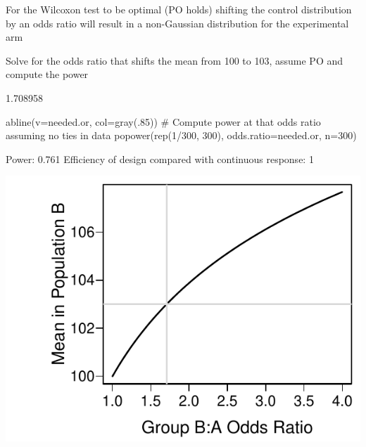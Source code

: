 \item For the Wilcoxon test to be optimal (PO holds) shifting the control distribution by an odds ratio will result in a non-Gaussian distribution for the experimental arm
\item Solve for the odds ratio that shifts the mean from 100 to 103, assume PO and compute the power

\begin{Schunk}
\begin{Soutput}
[1] 1.708958
\end{Soutput}
\begin{Sinput}
abline(v=needed.or, col=gray(.85))
# Compute power at that odds ratio assuming no ties in data
popower(rep(1/300, 300), odds.ratio=needed.or, n=300)
\end{Sinput}
\begin{Soutput}
Power: 0.761 
Efficiency of design compared with continuous response: 1 
\end{Soutput}


\centerline{\includegraphics[width=\maxwidth]{nonpar-powerwmean-1} }

\end{Schunk}


